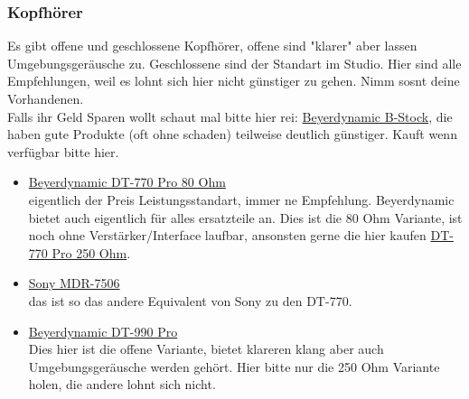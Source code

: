 \subsubsection{Kopfhörer}
Es gibt offene und geschlossene Kopfhörer, offene sind "klarer" aber lassen Umgebungsgeräusche zu. Geschlossene sind der Standart im Studio. Hier sind alle Empfehlungen, weil es lohnt sich hier nicht günstiger zu gehen. Nimm sosnt deine Vorhandenen. \\Falls ihr Geld Sparen wollt schaut mal bitte hier rei: \href{https://www.beyerdynamic.de/outlet.html?gad_source=1&gclid=Cj0KCQjwiuC2BhDSARIsALOVfBJ6sfr7q1aL37ZvTAGywnzx0hW6F8qXNQv-qk8qNju73Reqe1Cvn0AaAgraEALw_wcB}{Beyerdynamic B-Stock}, die haben gute Produkte (oft ohne schaden) teilweise deutlich günstiger. Kauft wenn verfügbar bitte hier.
\begin{itemize}
    \item \href{https://www.thomann.de/de/beyerdynamic_dt770_pro80_ohm.htm}{Beyerdynamic DT-770 Pro 80 Ohm}\\ eigentlich der Preis Leistungsstandart, immer ne Empfehlung. Beyerdynamic bietet auch eigentlich für alles ersatzteile an. Dies ist die 80 Ohm Variante, ist noch ohne Verstärker/Interface laufbar, ansonsten gerne die hier kaufen \href{https://www.thomann.de/de/beyerdynamic_dt770pro.htm}{DT-770 Pro 250 Ohm}.
    \item \href{https://www.thomann.de/de/sony_mdr7506_kopfhoerer.htm}{Sony MDR-7506}\\ das ist so das andere Equivalent von Sony zu den DT-770. 
    \item \href{https://www.thomann.de/de/beyerdynamic_dt990pro.htm}{Beyerdynamic DT-990 Pro} \\ Dies hier ist die offene Variante, bietet klareren klang aber auch Umgebungsgeräusche werden gehört. Hier bitte nur die 250 Ohm Variante holen, die andere lohnt sich nicht. 
\end{itemize}

